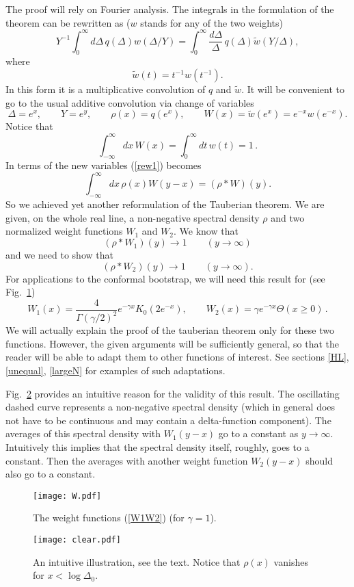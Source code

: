 \documentclass[12pt]{article}
\newcommand{\reef}[1]{(\ref{#1})}
\newcommand{\beq}{\begin{equation}}
\newcommand{\eeq}{\end{equation}}
\def\ge{\geqslant}
\newcommand{\D}{\Delta}
\numberwithin{equation}{section}
\begin{document}
The proof will rely on Fourier analysis. The integrals in the formulation of the theorem can be rewritten as ($w$ stands for any of the two weights)
\beq
\label{rew1}
Y^{-1}\int_0^\infty d\Delta\,q(\Delta) w (\Delta/Y) = \int_0^\infty \frac{d\Delta}{\D} \,q(\Delta) \tilde w (Y/\D),
\eeq
where
\beq
\tilde w(t)= t^{-1} w(t^{-1}).
\eeq 
In this form it is a multiplicative convolution of $q$ and $\tilde w$. It will be convenient to go to the usual additive convolution via change of variables
\beq
\Delta = e^x,\qquad Y=e^y,\qquad \rho(x) = q(e^x),\qquad W(x)= \tilde w(e^x) =e^{-x} w(e^{-x}).
\eeq
Notice that 
\beq
\int_{-\infty}^\infty dx\, W(x)=\int_0^\infty dt\,w(t) =1\,.
\eeq
In terms of the new variables \reef{rew1} becomes
\beq
\int_{-\infty}^\infty dx \,\rho (x) W (y-x) = (\rho*W)(y).
\eeq
So we achieved yet another reformulation of the Tauberian theorem. We are given, on the whole real line, a non-negative spectral density $\rho$ and two normalized weight functions $W_1$ and $W_2$. We know that
\beq
\label{W1}
\tag{$W_1$}
(\rho*W_1)(y)\to 1\qquad(y\to\infty) 
\eeq
and we need to show that
\beq
\label{W2}
\tag{$W_2$}
(\rho*W_2)(y)\to 1\qquad(y\to\infty).
\eeq
For applications to the conformal bootstrap, we will need this result for (see Fig.~\ref{W})
\beq
\label{W1W2}
W_1(x) = \frac{4}{\Gamma(\gamma/2)^2} e^{-\gamma x} K_0(2e^{-x}),\qquad W_2(x) = \gamma e^{-\gamma x} \Theta(x\ge 0)\,.
\eeq
We will actually explain the proof of the tauberian theorem only for these two functions. However, the given arguments will be sufficiently general, so that the reader will be able to adapt them to other functions of interest. See 
sections \ref{HL}, \ref{unequal}, \ref{largeN} for examples of such adaptations.

Fig.~\ref{clear} provides an intuitive reason for the validity of this result. The oscillating dashed curve represents a non-negative spectral density (which in general does not have to be continuous and may contain a delta-function component). The averages of this spectral density with $W_1(y-x)$ go to a constant as $y\to\infty$. Intuitively this implies that the spectral density itself, roughly, goes to a constant. Then the averages with another weight function $W_2(y-x)$ should also go to a constant. 

\begin{figure}
\centering
\texttt{[image: W.pdf]}
\caption{The weight functions \reef{W1W2} (for $\gamma=1$).}
\label{W}
\end{figure}


\begin{figure}
\centering
\texttt{[image: clear.pdf]}
\caption{An intuitive illustration, see the text. Notice that $\rho(x)$ vanishes for $x<\log \Delta_0$.}
\label{clear}
\end{figure}
\end{document}
